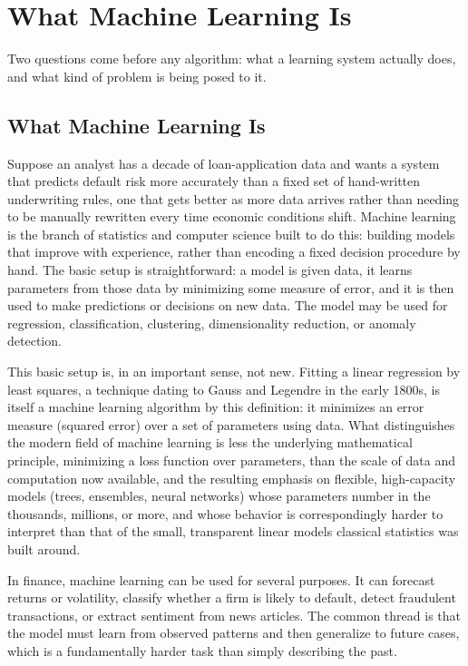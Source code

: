 \documentclass[../ai_in_finance]{subfiles}
\begin{document}
\section{What Machine Learning Is}

Two questions come before any algorithm: what a learning system actually does, and what kind of problem is being posed to it.

\subsection{What Machine Learning Is}

Suppose an analyst has a decade of loan-application data and wants a system that predicts default risk more accurately than a fixed set of hand-written underwriting rules, one that gets better as more data arrives rather than needing to be manually rewritten every time economic conditions shift. Machine learning is the branch of statistics and computer science built to do this: building models that improve with experience, rather than encoding a fixed decision procedure by hand. The basic setup is straightforward: a model is given data, it learns parameters from those data by minimizing some measure of error, and it is then used to make predictions or decisions on new data. The model may be used for regression, classification, clustering, dimensionality reduction, or anomaly detection.

This basic setup is, in an important sense, not new. Fitting a linear regression by least squares, a technique dating to Gauss and Legendre in the early 1800s, is itself a machine learning algorithm by this definition: it minimizes an error measure (squared error) over a set of parameters using data. What distinguishes the modern field of machine learning is less the underlying mathematical principle, minimizing a loss function over parameters, than the scale of data and computation now available, and the resulting emphasis on flexible, high-capacity models (trees, ensembles, neural networks) whose parameters number in the thousands, millions, or more, and whose behavior is correspondingly harder to interpret than that of the small, transparent linear models classical statistics was built around.

In finance, machine learning can be used for several purposes. It can forecast returns or volatility, classify whether a firm is likely to default, detect fraudulent transactions, or extract sentiment from news articles. The common thread is that the model must learn from observed patterns and then generalize to future cases, which is a fundamentally harder task than simply describing the past.
\end{document}
